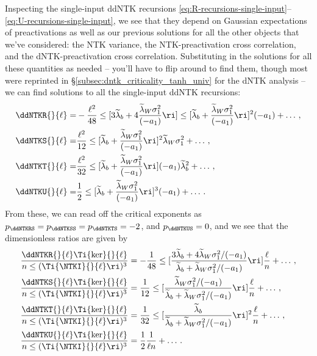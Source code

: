 Inspecting the single-input ddNTK recursions \eqref{eq:R-recursions-single-input}--\eqref{eq:U-recursions-single-input}, we see that they depend on Gaussian expectations of preactivations as well as our previous solutions for all the other objects that we've considered: the NTK variance, the NTK-preactivation cross correlation, and the dNTK-preactivation cross correlation. 
Substituting in the solutions for all these quantities as needed -- you'll have to flip around to find them, though most were reprinted in \S\ref{subsec:dntk_criticality_tanh_univ} for the dNTK analysis -- we can find solutions to all the single-input ddNTK recursions:
\begin{align}
\ddNTKR{}{\ell}=&-\frac{\ell^2}{48}\le[3\widetilde{\lambda}_b+4\frac{\widetilde{\lambda}_W\sigma_1^2}{(-a_1)}\ri]\le[\widetilde{\lambda}_b+\frac{\widetilde{\lambda}_W\sigma_1^2}{(-a_1)}\ri]^2 (-a_1)+\ldots\, ,\\
\ddNTKS{}{\ell}=&\frac{\ell^2}{12} \le[\widetilde{\lambda}_b+\frac{\widetilde{\lambda}_W\sigma_1^2}{(-a_1)}\ri]^2\widetilde{\lambda}_W\sigma_1^2+\ldots\, ,\\
\ddNTKT{}{\ell}=&\frac{\ell^2}{32}\le[\widetilde{\lambda}_b+\frac{\widetilde{\lambda}_W\sigma_1^2}{(-a_1)}\ri](-a_1) \widetilde{\lambda}_b^2+\ldots\, ,\\
\ddNTKU{}{\ell}=&\frac{1}{2}\le[\widetilde{\lambda}_b+\frac{\widetilde{\lambda}_W\sigma_1^2}{(-a_1)}\ri]^3(-a_1)+\ldots\, .
\end{align}
From these, we can read off the critical exponents as $p_\ddNTKRS = p_\ddNTKSS = p_\ddNTKTS = -2$, and $p_\ddNTKUS=0$, and we see that the dimensionless ratios are given by 
\begin{align}\label{eq:scaling-relations-ddNTKs-K-star}
\frac{\ddNTKR{}{\ell} \Ti{\ker}{}{\ell}}{n \le( \Ti{\NTKI}{}{\ell} \ri)^3 } &=-\frac{1}{48}\le[\frac{3\widetilde{\lambda}_b +4 \widetilde{\lambda}_W\sigma_1^2/(-a_1) }{\widetilde{\lambda}_b +\widetilde{\lambda}_W\sigma_1^2/(-a_1) }\ri] \frac{\ell}{n}+ \ldots\, , \\
\frac{\ddNTKS{}{\ell}\Ti{\ker}{}{\ell}}{n \le( \Ti{\NTKI}{}{\ell} \ri)^3} &=\frac{1}{12}\le[\frac{ \widetilde{\lambda}_W\sigma_1^2/(-a_1) }{\widetilde{\lambda}_b +\widetilde{\lambda}_W\sigma_1^2/(-a_1) }\ri] \frac{\ell}{n}+ \ldots\, , \\
\frac{\ddNTKT{}{\ell} \Ti{\ker}{}{\ell}}{n \le( \Ti{\NTKI}{}{\ell} \ri)^3 } &=\frac{1}{32}\le[\frac{ \widetilde{\lambda}_b  }{\widetilde{\lambda}_b +\widetilde{\lambda}_W\sigma_1^2/(-a_1) }\ri]^2 \frac{\ell}{n}+ \ldots \, , \\
\frac{\ddNTKU{}{\ell}\Ti{\ker}{}{\ell}}{n \le( \Ti{\NTKI}{}{\ell} \ri)^3} &=\frac{1}{2} \frac{1}{\ell n } + \ldots \, .
\end{align}
